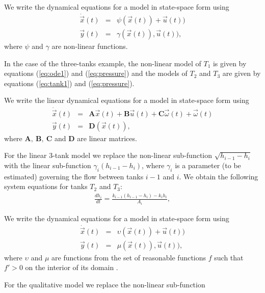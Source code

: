 \begin{definition}
We write the dynamical equations for a model in state-space form using
\begin{eqnarray}\label{eq:nonlinear}
\dot{\vec{x}}(t) & = & \psi (\vec{x}(t)) + \vec{u}(t))\\
\vec{y}(t) & = & \gamma (\vec{x}(t)), \vec{u}(t)),
\end{eqnarray}
where $\psi$ and $\gamma$ are non-linear functions.
\end{definition}
%
In the case of the three-tanks example, the non-linear model of $T_1$
is given by equations (\ref{eq:ode1}) and (\ref{eq:pressure}) and the
models of $T_2$ and $T_3$ are given by equations (\ref{eq:tank1}) and
(\ref{eq:pressure}).
%
\begin{definition}
We write the linear dynamical equations for a model in state-space form using
\begin{eqnarray}\label{eq:linear}
\dot{\vec{x}}(t) & = & \mathbf{A} \vec{x}(t) + \mathbf{B} \vec{u}(t) + \mathbf{C} \vec{\omega}(t) +  \vec{\omega}(t)\\
\vec{y}(t) & = & \mathbf{D} (\vec{x}(t)),
\end{eqnarray}
where $\mathbf{A}, ~ \mathbf{B},~\mathbf{C}$ and $\mathbf{D}$ are linear matrices.
\end{definition}
%
For the linear 3-tank model we replace the non-linear sub-function
$\sqrt{h_{i - 1} - h_i}$ with the linear sub-function $\gamma_i (h_{i
- 1} - h_i)$, where $\gamma_i$ is a parameter (to be estimated)
governing the flow between tanks $i - 1$ and $i$. We obtain the
following system equations for tanks $T_2$ and $T_3$:
%
\begin{eqnarray}\label{eq:lineartank}
%
\frac{d h_i}{dt} = \frac{k_{i - 1}(h_{i - 1} - h_{i}) - k_i {h_i}}{A_i},
%
\end{eqnarray}
%
\begin{definition}
We write the dynamical equations for a model in state-space form using
\begin{eqnarray}\label{qual-model}
\dot{\vec{x}}(t) & = & \upsilon (\vec{x}(t)) + \vec{u}(t))\\
\vec{y}(t) & = & \mu (\vec{x}(t)), \vec{u}(t)),
\end{eqnarray}
where $\upsilon$ and $\mu$ are functions from the set of reasonable
functions $f$ such that $f' > 0$ on the interior of its domain
\citep{kuipers1994composition}.
\end{definition}
%
For the qualitative model we replace the non-linear sub-function
